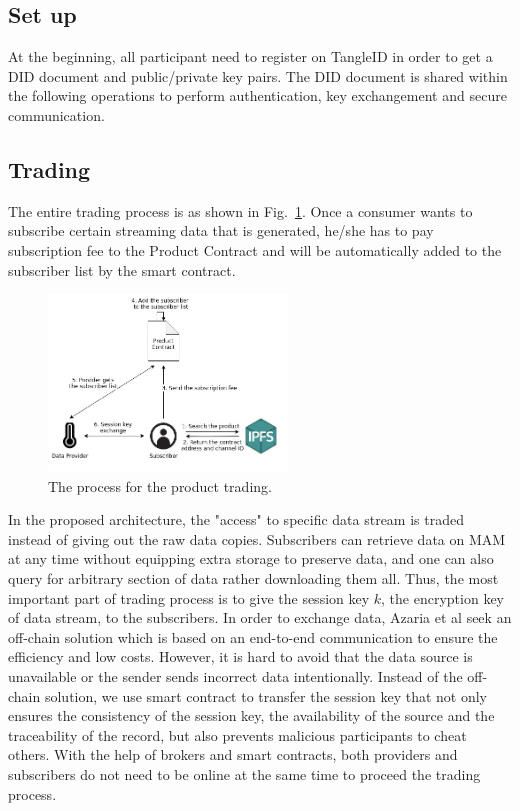 \documentclass[conference]{IEEEtran}
\begin{document}
\subsection{Set up}
At the beginning, all participant need to register on TangleID in order to get a DID document and public/private key pairs. The DID document is shared within the following operations to perform authentication, key exchangement and secure communication. 

\subsection{Trading}
\label{section:trading}

The entire trading process is as shown in Fig.~\ref{fig:trading_product}. Once a consumer wants to subscribe certain streaming data that is generated, he/she has to pay subscription fee to the Product Contract and will be automatically added to the subscriber list by the smart contract.

\begin{figure}[!t]
    \centering
    \includegraphics[width=2.5in]{trading_product}
    \caption{The process for the product trading.}
    \label{fig:trading_product}
\end{figure}

In the proposed architecture, the "access" to specific data stream is traded instead of giving out the raw data copies. Subscribers can retrieve data on MAM at any time without equipping extra storage to preserve data, and one can also query for arbitrary section of data rather downloading them all. Thus, the most important part of trading process is to give the session key $k$, the encryption key of data stream, to the subscribers. In order to exchange data, Azaria et al\cite{Medrec} seek an off-chain solution which is based on an end-to-end communication to ensure the efficiency and low costs. However, it is hard to avoid that the data source is unavailable or the sender sends incorrect data intentionally. Instead of the off-chain solution, we use smart contract to transfer the session key\cite{3tierDataMarket} that not only ensures the consistency of the session key, the availability of the source and the traceability of the record, but also prevents malicious participants to cheat others. With the help of brokers and smart contracts, both providers and subscribers do not need to be online at the same time to proceed the trading process.
\end{document}
